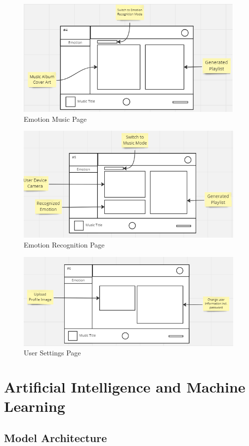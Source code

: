 \begin{figure}[!ht]
    \centering
    \includegraphics[width=12cm]{Images/emotion.png}
    \caption{Emotion Music Page}
    \label{fig:emotion}
\end{figure}
\begin{figure}[!ht]
    \centering
    \includegraphics[width=12cm]{Images/detection.png}
    \caption{Emotion Recognition Page}
    \label{fig:emotion-recog}
\end{figure}
\begin{figure}[!ht]
    \centering
    \includegraphics[width=12cm]{Images/user-settings.png}
    \caption{User Settings Page}
    \label{fig:usr-settings}
\end{figure}
\section{Artificial Intelligence and Machine Learning}
\subsection{Model Architecture}